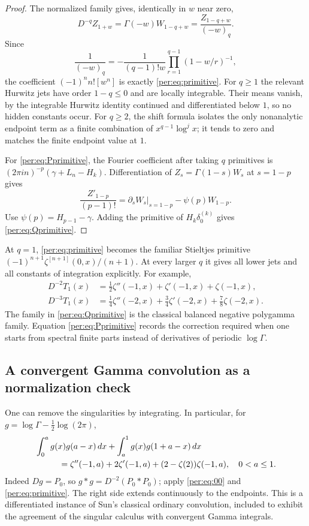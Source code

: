 \documentclass[11pt,letterpaper]{article}
\numberwithin{equation}{section}
\theoremstyle{plain}
\theoremstyle{definition}
\theoremstyle{remark}
\begin{document}
\begin{proof}
The normalized family gives, identically in $w$ near zero,
\begin{equation}\label{per:eq:primitivegenerator}
 D^{-q}Z_{1+w}
 =\Gamma(-w)W_{1-q+w}
 =\frac{Z_{1-q+w}}{(-w)_q}.
\end{equation}
Since
\[
 \frac1{(-w)_q}
 =-\frac1{(q-1)!w}\prod_{r=1}^{q-1}(1-w/r)^{-1},
\]
the coefficient $(-1)^nn![w^n]$ is exactly
\eqref{per:eq:primitive}. For $q\ge1$ the relevant Hurwitz jets have
order $1-q\le0$ and are locally integrable. Their means vanish, by the
integrable Hurwitz identity continued and differentiated below $1$,
so no hidden constants occur. For $q\ge2$, the shift formula isolates
the only nonanalytic endpoint term as a finite combination of
$x^{q-1}\log^j x$; it tends to zero and matches the finite endpoint
value at $1$.

For \eqref{per:eq:Pprimitive}, the Fourier coefficient after taking
$q$ primitives is $(2\pi i n)^{-p}(\gamma+L_n-H_k)$.
Differentiation of $Z_s=\Gamma(1-s)W_s$ at $s=1-p$ gives
\[
 \frac{Z'_{1-p}}{(p-1)!}
 =\partial_sW_s\big|_{s=1-p}-\psi(p)W_{1-p}.
\]
Use $\psi(p)=H_{p-1}-\gamma$. Adding the primitive of
$H_k\delta_0^{(k)}$ gives \eqref{per:eq:Qprimitive}.
\end{proof}

At $q=1$, \eqref{per:eq:primitive} becomes the familiar Stieltjes
primitive $(-1)^{n+1}\zeta^{[n+1]}(0,x)/(n+1)$. At every larger $q$
it gives all lower jets and all constants of integration explicitly.
For example,
\begin{align*}
 D^{-2}T_1(x)&=\tfrac12\zeta''(-1,x)+\zeta'(-1,x)+\zeta(-1,x),\\
 D^{-3}T_1(x)&=\tfrac14\zeta''(-2,x)+\tfrac34\zeta'(-2,x)
                                      +\tfrac78\zeta(-2,x).
\end{align*}
The family in \eqref{per:eq:Qprimitive} is the classical balanced
negative polygamma family. Equation \eqref{per:eq:Pprimitive} records
the correction required when one starts from spectral finite parts
instead of derivatives of periodic $\log\Gamma$.


\subsection{A convergent Gamma convolution as a normalization check}

One can remove the singularities by integrating. In particular, for
$g=\log\Gamma-\tfrac12\log(2\pi)$,
\begin{align}
 &\int_0^a g(x)g(a-x)\,dx
       +\int_a^1g(x)g(1+a-x)\,dx\notag\\
 &\hspace{10mm}=\zeta''(-1,a)+2\zeta'(-1,a)
                           +(2-\zeta(2))\zeta(-1,a),\quad 0<a\le1.
 \label{per:eq:gammaordinary}
\end{align}
Indeed $Dg=P_0$, so $g*g=D^{-2}(P_0*P_0)$; apply
\eqref{per:eq:00} and \eqref{per:eq:primitive}. The right side extends
continuously to the endpoints. This is a differentiated instance of
Sun's classical ordinary convolution, included to exhibit the agreement
of the singular calculus with convergent Gamma integrals.
\end{document}
